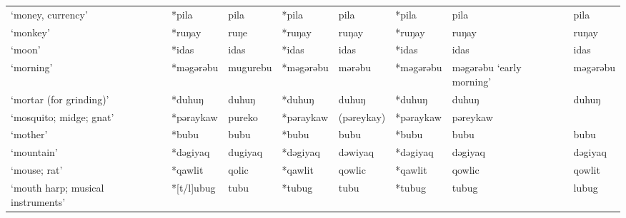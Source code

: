 \begin{landscape}
\begin{longtable}[c]{@{}p{3cm}<{\raggedright}p{2.75cm}<{\raggedright}p{2.75cm}<{\raggedright}p{2.75cm}<{\raggedright}p{2.75cm}<{\raggedright}p{2.75cm}<{\raggedright}p{2.75cm}<{\raggedright}p{2.75cm}<{\raggedright}@{}}
`money, currency'                                    & *pila        & pila                          & *pila          & pila                       & *pila            & pila                     & pila                              \\
`monkey'                                             & *ruŋay       & ruŋe                          & *ruŋay         & ruŋay                      & *ruŋay           & ruŋay                    & ruŋay                             \\
`moon'                                               & *idas        & idas                          & *idas          & idas                       & *idas            & idas                     & idas                              \\
`morning'                                            & *məgərəbu    & mugurebu                      & *məgərəbu      & mərəbu                     & *məgərəbu        & məgərəbu `early morning' & məgərəbu                          \\
`mortar (for grinding)'                              & *duhuŋ       & duhuŋ                         & *duhuŋ         & duhuŋ                      & *duhuŋ           & duhuŋ                    & duhuŋ                             \\
`mosquito; midge; gnat'                              & *pəraykaw    & pureko                        & *pəraykaw      & (pəreykay)                 & *pəraykaw        & pəreykaw                 &                                   \\
`mother'                                             & *bubu        & bubu                          & *bubu          & bubu                       & *bubu            & bubu                     & bubu                              \\
`mountain'                                           & *dəgiyaq     & dugiyaq                       & *dəgiyaq       & dəwiyaq                    & *dəgiyaq         & dəgiyaq                  & dəgiyaq                           \\
`mouse; rat'                                         & *qawlit      & qolic                         & *qawlit        & qowlic                     & *qawlit          & qowlic                   & qowlit                            \\
`mouth harp; musical instruments'                    & *[t/l]ubug   & tubu                          & *tubug         & tubu                       & *tubug           & tubug                    & lubug                             \\

\end{longtable}
\end{landscape}
